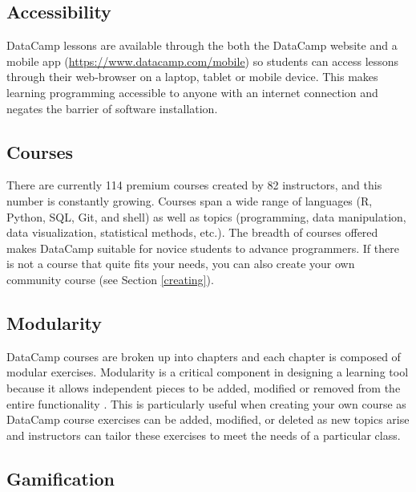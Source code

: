 \documentclass{tise_style_doi}
\begin{document}
\subsection{Accessibility}

DataCamp lessons are available through the both the DataCamp website and a mobile app
(\url{https://www.datacamp.com/mobile}) so students can access lessons through their
web-browser on a laptop, tablet or mobile device.  This makes learning programming
accessible to anyone with an internet connection and negates the barrier of software installation.

\subsection{Courses}

There are currently 114 premium courses created by 82 instructors, and this
number is constantly growing.  Courses span a wide range of languages (R, Python, SQL,
Git, and shell) as well as topics (programming, data manipulation, data visualization,
statistical methods, etc.).  The breadth of courses offered makes DataCamp suitable
for novice students to advance programmers. If there is not a course that quite
fits your needs, you can also create your own community course (see Section \ref{creating}).

\subsection{Modularity}

DataCamp courses are broken up into chapters and each chapter is composed of modular
exercises. Modularity is a critical component in designing a learning tool because it
allows independent pieces to be added, modified or removed from the entire functionality
\citep{Hare2017}. This is particularly useful when creating your own course as DataCamp
course exercises can be added, modified, or deleted as new topics arise and instructors
can tailor these exercises to meet the needs of a particular class.

\subsection{Gamification}
\end{document}
